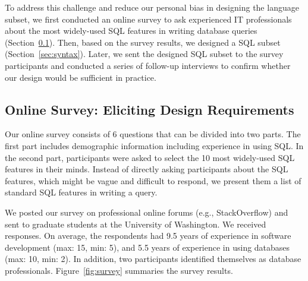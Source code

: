 To address this challenge and reduce our personal bias
in designing the language subset, we first conducted an online survey
to ask experienced IT professionals about the most widely-used
SQL features in writing database queries (Section~\ref{sec:survey}).
Then, based on the survey results, we designed
a SQL subset (Section~\ref{sec:syntax}).  
Later, we sent the designed SQL subset to the survey participants
and conducted a series of follow-up interviews
to confirm whether our design would be sufficient in practice.









\vspace{-1mm}
\subsection{Online Survey: Eliciting Design Requirements}
\label{sec:survey}

\vspace{-1mm}

Our online survey consists of 6 questions that can be
divided into two parts. The first part includes
demographic information including experience in using SQL.
In the second part, participants were asked to select
the 10 most widely-used SQL features in their minds.
Instead of directly asking participants about the SQL
features, which might be vague and difficult to respond,
we present them a list of standard
SQL features in writing a query.



We posted our survey on professional online forums (e.g., StackOverflow)
and sent to graduate students at the University of Washington.
We received \respnum responses.
On average, the respondents had 9.5 years of experience
in software development (max: 15, min: 5),
and 5.5 years of experience in
using databases (max: 10, min: 2). In addition, two
participants identified themselves as database professionals.
Figure~\ref{fig:survey} summaries the survey results.

